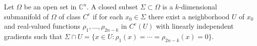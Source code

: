 
Let $\Omega$ be an open set in $\mathbb{C}^n$. A closed subset $\Sigma \subset \Omega$ is a $k$-dimensional submanifold of $\Omega$ of class $C^e$ if for each $x_0 \in \Sigma$ there exist a neighborhood $U$ of $x_0$ and real-valued functions $\rho_1, \ldots, \rho_{2n-k}$ in $C^e(U)$ with linearly independent gradients such that $\Sigma \cap U = \{x \in U : \rho_1(x) = \cdots = \rho_{2n-k}(x) = 0\}$.
